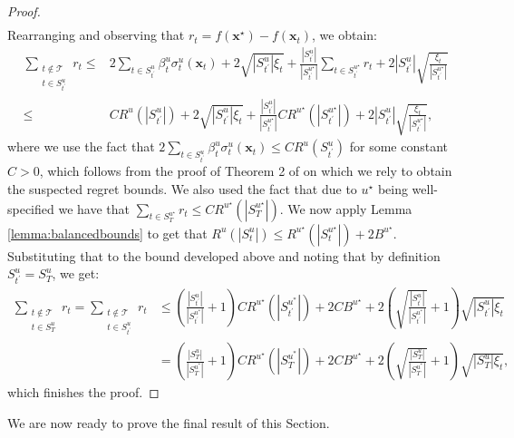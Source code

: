 \documentclass{article}
\theoremstyle{plain}
\theoremstyle{definition}
\theoremstyle{remark}
\theoremstyle{plain}
\begin{document}
\begin{proof}
\begin{align*}
\end{align*}
Rearranging and observing that $r_t = f(\bm{x}^\star) - f(\bm{x}_t)$, we obtain:
\begin{align*}
\sum_{\substack{t \notin \mathcal{T} \\     t \in S_{t^\prime}^{u}}} r_t    \le &  2\sum_{t \in S_{t^\prime}^{u}} \beta_t^{u}\sigma_t^{u}(\bm{x}_t) + 2\sqrt{|S_{t^\prime}^{u}|\xi_t} +  \frac{|S_{t^\prime}^{u}|}{|S_{t^\prime}^{u^\star}|} \sum_{t \in S_{t^\prime}^{u^\star}} r_t  + 2|S_{t^\prime}^{u}|\sqrt{\frac{\xi_t}{|S_{t^\prime}^{u^\star}|} } \\
\le &  C R^{u}(|S_{t^\prime}^{u}|)+ 2\sqrt{|S_{t^\prime}^{u}|\xi_t}+  \frac{|S_{t^\prime}^{u}|}{|S_{t^\prime}^{u^\star}|} CR^{u^\star}(|S_{t^\prime}^{u^\star}|) + 2|S_{t^\prime}^{u}|\sqrt{\frac{\xi_t}{|S_{t^\prime}^{u^\star}|} },
\end{align*}
where we use the fact that $2\sum_{t \in S_{t^\prime}^{u}} \beta_t^{u}\sigma_t^{u}(\bm{x}_t) \le CR^{u}(S_{t^\prime}^{u})$ for some constant $C > 0$, which follows from the proof of Theorem 2 of \cite{chowdhury2017kernelized} on which we rely to obtain the suspected regret bounds. We also used the fact that due to $u^\star$ being well-specified we have that $\sum_{t \in S_T^{u^\star}} r_t \le C R^{u^\star}(|S_T^{u^\star}|)$. We now apply Lemma \ref{lemma:balancedbounds} to get that $ R^{u}(|S_t^{u}|) \le  R^{u^\star}(|S_t^{u^\star}|) + 2B^{u^\star}$. Substituting that to the bound developed above and noting that by definition $S_{t^\prime}^u = S_T^u$, we get:
\begin{align*}
    \sum_{\substack{t \notin \mathcal{T} \\     t \in S_T^{u}}} r_t = \sum_{\substack{t \notin \mathcal{T} \\     t \in S_{t^\prime}^{u}}} r_t
  &\le \left(\frac{|S_{t^\prime}^{u}|}{|S_{t^\prime}^{u^*}|} + 1 \right) CR^{u^\star}(|S_{t^\prime}^{u^*}|) + 2CB^{u^\star} + 2\left(\sqrt{\frac{|S_{t^\prime}^{u}|}{|S_{t^\prime}^{u^*}|}} + 1\right)\sqrt{|S_{t^\prime}^{u}|\xi_t}  \\
  & = \left(\frac{|S_T^{u}|}{|S_T^{u^*}|} + 1 \right) CR^{u^\star}(|S_T^{u^*}|) + 2CB^{u^\star} + 2\left(\sqrt{\frac{|S_T^{u}|}{|S_T^{u^*}|}} + 1\right)\sqrt{|S_T^{u}|\xi_t} ,
\end{align*}
which finishes the proof.
\end{proof}
 We are now ready to prove the final result of this Section.
\end{document}
